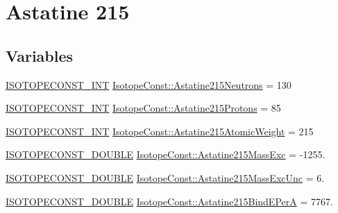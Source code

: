 \hypertarget{group___isotope_const-_astatine-_at215}{}\section{Astatine 215}
\label{group___isotope_const-_astatine-_at215}
\subsection*{Variables}
\begin{DoxyCompactItemize}
\item 
\mbox{\hyperlink{group___isotope_const-_macros_ga5f18360b3e99483a35c32d789e62621c}{I\+S\+O\+T\+O\+P\+E\+C\+O\+N\+S\+T\+\_\+\+I\+NT}} \mbox{\hyperlink{group___isotope_const-_astatine-_at215_ga86aa55632de4771adaede7058b5f6191}{Isotope\+Const\+::\+Astatine215\+Neutrons}} = 130
\item 
\mbox{\hyperlink{group___isotope_const-_macros_ga5f18360b3e99483a35c32d789e62621c}{I\+S\+O\+T\+O\+P\+E\+C\+O\+N\+S\+T\+\_\+\+I\+NT}} \mbox{\hyperlink{group___isotope_const-_astatine-_at215_ga2677186cef50b2131e410840811519df}{Isotope\+Const\+::\+Astatine215\+Protons}} = 85
\item 
\mbox{\hyperlink{group___isotope_const-_macros_ga5f18360b3e99483a35c32d789e62621c}{I\+S\+O\+T\+O\+P\+E\+C\+O\+N\+S\+T\+\_\+\+I\+NT}} \mbox{\hyperlink{group___isotope_const-_astatine-_at215_ga1788da5e10db7eee8e2e920ee036b8d0}{Isotope\+Const\+::\+Astatine215\+Atomic\+Weight}} = 215
\item 
\mbox{\hyperlink{group___isotope_const-_macros_ga8f45a7272ce02c0b4c65c44636ed719a}{I\+S\+O\+T\+O\+P\+E\+C\+O\+N\+S\+T\+\_\+\+D\+O\+U\+B\+LE}} \mbox{\hyperlink{group___isotope_const-_astatine-_at215_ga691fb3514d144668b0a7dd0eaf0f417d}{Isotope\+Const\+::\+Astatine215\+Mass\+Exc}} = -\/1255.
\item 
\mbox{\hyperlink{group___isotope_const-_macros_ga8f45a7272ce02c0b4c65c44636ed719a}{I\+S\+O\+T\+O\+P\+E\+C\+O\+N\+S\+T\+\_\+\+D\+O\+U\+B\+LE}} \mbox{\hyperlink{group___isotope_const-_astatine-_at215_gaba58354973f852052b9f3fd03434ff0c}{Isotope\+Const\+::\+Astatine215\+Mass\+Exc\+Unc}} = 6.
\item 
\mbox{\hyperlink{group___isotope_const-_macros_ga8f45a7272ce02c0b4c65c44636ed719a}{I\+S\+O\+T\+O\+P\+E\+C\+O\+N\+S\+T\+\_\+\+D\+O\+U\+B\+LE}} \mbox{\hyperlink{group___isotope_const-_astatine-_at215_ga197eb68e8959f07a9834db8d2c1a4268}{Isotope\+Const\+::\+Astatine215\+Bind\+E\+PerA}} = 7767.
\item 

\end{DoxyCompactItemize}
